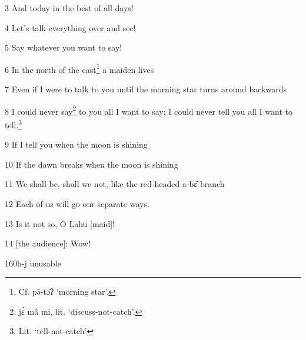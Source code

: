 3 And today in the best of all days!

4 Let's talk everything over and see!

5 Say whatever you want to say!

6 In the north of the east\footnote{Cf. pə̄-tɔ̂ʔ `morning star'.} a maiden lives

7 Even if I were to talk to you until the morning star turns around backwards

8 I could never say\footnote{jɛ̀ mâ mi, lit. `discuss-not-catch'.} to you all I want to say; I could never tell you all I want
to tell.\footnote{Lit. `tell-not-catch'}

9 If I tell you when the moon is shining

10 If the dawn breaks when the moon is shining

11 We shall be, shall we not, like the red-headed a-bɛ̂ branch

12 Each of us will go our separate ways.

13 Is it not so, O Lahu [maid]!

14 [the audience]: Wow!

160h-j unusable

